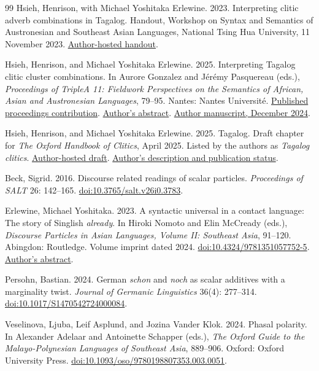 \begin{thebibliography}{99}
Hsieh, Henrison, with Michael Yoshitaka Erlewine. 2023.
Interpreting clitic adverb combinations in Tagalog.
Handout, Workshop on Syntax and Semantics of Austronesian and Southeast Asian
Languages, National Tsing Hua University, 11 November 2023.
\href{https://henrison.github.io/files/nthu-clitics.pdf}{Author-hosted handout}.

Hsieh, Henrison, and Michael Yoshitaka Erlewine. 2025.
Interpreting Tagalog clitic cluster combinations.
In Aurore Gonzalez and J\'{e}r\'{e}my Pasquereau (eds.),
\textit{Proceedings of TripleA 11: Fieldwork Perspectives on the Semantics of
African, Asian and Austronesian Languages}, 79--95.
Nantes: Nantes Universit\'{e}.
\href{https://hal.science/hal-05363613v1}{Published proceedings contribution}.
\href{https://mitcho.com/research/clitics-triplea.html}{Author's abstract}.
\href{https://lingbuzz.net/lingbuzz/008660/current.pdf}{Author manuscript, December 2024}.

Hsieh, Henrison, and Michael Yoshitaka Erlewine. 2025.
Tagalog.
Draft chapter for \textit{The Oxford Handbook of Clitics}, April 2025.
Listed by the authors as \textit{Tagalog clitics}.
\href{https://ling.auf.net/lingbuzz/008985/current.pdf}{Author-hosted draft}.
\href{https://mitcho.com/research/clitics-handbook.html}{Author's description and publication status}.

Beck, Sigrid. 2016.
Discourse related readings of scalar particles.
\textit{Proceedings of SALT} 26: 142--165.
\href{https://doi.org/10.3765/salt.v26i0.3783}{doi:10.3765/salt.v26i0.3783}.

Erlewine, Michael Yoshitaka. 2023.
A syntactic universal in a contact language: The story of Singlish \textit{already}.
In Hiroki Nomoto and Elin McCready (eds.),
\textit{Discourse Particles in Asian Languages, Volume II: Southeast Asia}, 91--120.
Abingdon: Routledge. Volume imprint dated 2024.
\href{https://doi.org/10.4324/9781351057752-5}{doi:10.4324/9781351057752-5}.
\href{https://mitcho.com/research/already.html}{Author's abstract}.

Persohn, Bastian. 2024.
German \textit{schon} and \textit{noch} as scalar additives with a marginality twist.
\textit{Journal of Germanic Linguistics} 36(4): 277--314.
\href{https://doi.org/10.1017/S1470542724000084}{doi:10.1017/S1470542724000084}.

Veselinova, Ljuba, Leif Asplund, and Jozina Vander Klok. 2024.
Phasal polarity.
In Alexander Adelaar and Antoinette Schapper (eds.),
\textit{The Oxford Guide to the Malayo-Polynesian Languages of Southeast Asia}, 889--906.
Oxford: Oxford University Press.
\href{https://doi.org/10.1093/oso/9780198807353.003.0051}{doi:10.1093/oso/9780198807353.003.0051}.


\end{thebibliography}
